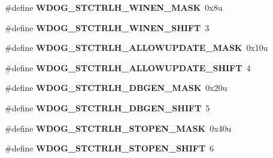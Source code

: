 \begin{DoxyCompactItemize}
\item 
\hypertarget{group___w_d_o_g___register___masks_ga74edc83d2a673f012aeff6410a8be861}{}\#define {\bfseries W\+D\+O\+G\+\_\+\+S\+T\+C\+T\+R\+L\+H\+\_\+\+W\+I\+N\+E\+N\+\_\+\+M\+A\+S\+K}~0x8u\label{group___w_d_o_g___register___masks_ga74edc83d2a673f012aeff6410a8be861}

\item 
\hypertarget{group___w_d_o_g___register___masks_gae0770ee0a74441bd3d2e0d3c291ca4b6}{}\#define {\bfseries W\+D\+O\+G\+\_\+\+S\+T\+C\+T\+R\+L\+H\+\_\+\+W\+I\+N\+E\+N\+\_\+\+S\+H\+I\+F\+T}~3\label{group___w_d_o_g___register___masks_gae0770ee0a74441bd3d2e0d3c291ca4b6}

\item 
\hypertarget{group___w_d_o_g___register___masks_gaf524a1ad1f811741b27f29836d6137ee}{}\#define {\bfseries W\+D\+O\+G\+\_\+\+S\+T\+C\+T\+R\+L\+H\+\_\+\+A\+L\+L\+O\+W\+U\+P\+D\+A\+T\+E\+\_\+\+M\+A\+S\+K}~0x10u\label{group___w_d_o_g___register___masks_gaf524a1ad1f811741b27f29836d6137ee}

\item 
\hypertarget{group___w_d_o_g___register___masks_gaf2ae60bccb334321f860b2480d916604}{}\#define {\bfseries W\+D\+O\+G\+\_\+\+S\+T\+C\+T\+R\+L\+H\+\_\+\+A\+L\+L\+O\+W\+U\+P\+D\+A\+T\+E\+\_\+\+S\+H\+I\+F\+T}~4\label{group___w_d_o_g___register___masks_gaf2ae60bccb334321f860b2480d916604}

\item 
\hypertarget{group___w_d_o_g___register___masks_ga837911a61f223e74ea90cca76f08a787}{}\#define {\bfseries W\+D\+O\+G\+\_\+\+S\+T\+C\+T\+R\+L\+H\+\_\+\+D\+B\+G\+E\+N\+\_\+\+M\+A\+S\+K}~0x20u\label{group___w_d_o_g___register___masks_ga837911a61f223e74ea90cca76f08a787}

\item 
\hypertarget{group___w_d_o_g___register___masks_ga9fdcaa733bd0393d4bce730c1d2c90c5}{}\#define {\bfseries W\+D\+O\+G\+\_\+\+S\+T\+C\+T\+R\+L\+H\+\_\+\+D\+B\+G\+E\+N\+\_\+\+S\+H\+I\+F\+T}~5\label{group___w_d_o_g___register___masks_ga9fdcaa733bd0393d4bce730c1d2c90c5}

\item 
\hypertarget{group___w_d_o_g___register___masks_gab78af949041ea10c257c8276c8e2782a}{}\#define {\bfseries W\+D\+O\+G\+\_\+\+S\+T\+C\+T\+R\+L\+H\+\_\+\+S\+T\+O\+P\+E\+N\+\_\+\+M\+A\+S\+K}~0x40u\label{group___w_d_o_g___register___masks_gab78af949041ea10c257c8276c8e2782a}

\item 
\hypertarget{group___w_d_o_g___register___masks_ga46b2b7b0c6a5938cfa26d96ba332d5d0}{}\#define {\bfseries W\+D\+O\+G\+\_\+\+S\+T\+C\+T\+R\+L\+H\+\_\+\+S\+T\+O\+P\+E\+N\+\_\+\+S\+H\+I\+F\+T}~6\label{group___w_d_o_g___register___masks_ga46b2b7b0c6a5938cfa26d96ba332d5d0}


\end{DoxyCompactItemize}
